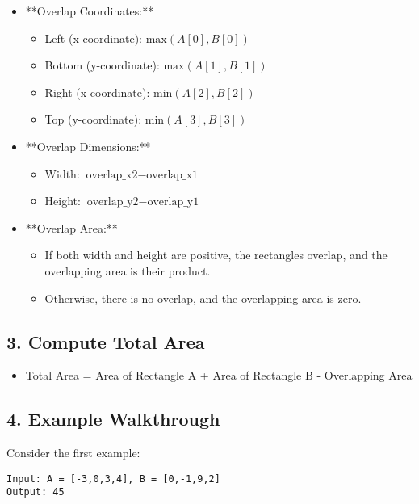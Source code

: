 \begin{itemize}
    \item **Overlap Coordinates:**
    \begin{itemize}
        \item Left (x-coordinate): \(\text{max}(A[0], B[0])\)
        \item Bottom (y-coordinate): \(\text{max}(A[1], B[1])\)
        \item Right (x-coordinate): \(\text{min}(A[2], B[2])\)
        \item Top (y-coordinate): \(\text{min}(A[3], B[3])\)
    \end{itemize}
    
    \item **Overlap Dimensions:**
    \begin{itemize}
        \item Width: \(\text{overlap\_x2} - \text{overlap\_x1}\)
        \item Height: \(\text{overlap\_y2} - \text{overlap\_y1}\)
    \end{itemize}
    
    \item **Overlap Area:**
    \begin{itemize}
        \item If both width and height are positive, the rectangles overlap, and the overlapping area is their product.
        \item Otherwise, there is no overlap, and the overlapping area is zero.
    \end{itemize}
\end{itemize}

\subsection*{3. Compute Total Area}

\begin{itemize}
    \item Total Area = Area of Rectangle A + Area of Rectangle B - Overlapping Area
\end{itemize}

\subsection*{4. Example Walkthrough}

Consider the first example:
\begin{verbatim}
Input: A = [-3,0,3,4], B = [0,-1,9,2]
Output: 45
\end{verbatim}

